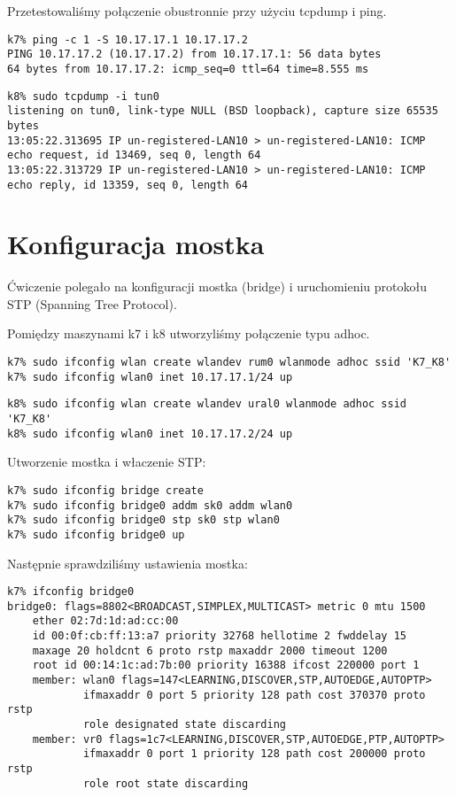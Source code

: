 \documentclass[a4paper,11pt,notitlepage]{article}
\begin{document}
Przetestowaliśmy połączenie obustronnie przy użyciu tcpdump i ping.

\begin{verbatim}
k7% ping -c 1 -S 10.17.17.1 10.17.17.2
PING 10.17.17.2 (10.17.17.2) from 10.17.17.1: 56 data bytes
64 bytes from 10.17.17.2: icmp_seq=0 ttl=64 time=8.555 ms
\end{verbatim}
\begin{verbatim}
k8% sudo tcpdump -i tun0
listening on tun0, link-type NULL (BSD loopback), capture size 65535 bytes
13:05:22.313695 IP un-registered-LAN10 > un-registered-LAN10: ICMP echo request, id 13469, seq 0, length 64
13:05:22.313729 IP un-registered-LAN10 > un-registered-LAN10: ICMP echo reply, id 13359, seq 0, length 64
\end{verbatim}

\section{Konfiguracja mostka}
Ćwiczenie polegało na konfiguracji mostka (bridge) i uruchomieniu protokołu STP (Spanning Tree Protocol).



Pomiędzy maszynami k7 i k8 utworzyliśmy połączenie typu adhoc.
\begin{verbatim}
k7% sudo ifconfig wlan create wlandev rum0 wlanmode adhoc ssid 'K7_K8'
k7% sudo ifconfig wlan0 inet 10.17.17.1/24 up
\end{verbatim}
\begin{verbatim}
k8% sudo ifconfig wlan create wlandev ural0 wlanmode adhoc ssid 'K7_K8'
k8% sudo ifconfig wlan0 inet 10.17.17.2/24 up
\end{verbatim}

Utworzenie mostka i właczenie STP:
\begin{verbatim}
k7% sudo ifconfig bridge create
k7% sudo ifconfig bridge0 addm sk0 addm wlan0
k7% sudo ifconfig bridge0 stp sk0 stp wlan0
k7% sudo ifconfig bridge0 up
\end{verbatim}

Następnie sprawdziliśmy ustawienia mostka:

\begin{verbatim}
k7% ifconfig bridge0
bridge0: flags=8802<BROADCAST,SIMPLEX,MULTICAST> metric 0 mtu 1500
	ether 02:7d:1d:ad:cc:00
	id 00:0f:cb:ff:13:a7 priority 32768 hellotime 2 fwddelay 15
	maxage 20 holdcnt 6 proto rstp maxaddr 2000 timeout 1200
	root id 00:14:1c:ad:7b:00 priority 16388 ifcost 220000 port 1
	member: wlan0 flags=147<LEARNING,DISCOVER,STP,AUTOEDGE,AUTOPTP>
	        ifmaxaddr 0 port 5 priority 128 path cost 370370 proto rstp
	        role designated state discarding
	member: vr0 flags=1c7<LEARNING,DISCOVER,STP,AUTOEDGE,PTP,AUTOPTP>
	        ifmaxaddr 0 port 1 priority 128 path cost 200000 proto rstp
	        role root state discarding
\end{verbatim}
\end{document}
